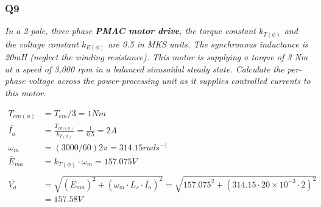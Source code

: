 \documentclass[a4paper,11pt]{article}
\begin{document}
\subsubsection*{Q9}
\textit{In a 2-pole, three-phase \textbf{PMAC motor drive}, the torque constant $k_{T(\phi)}$ and the voltage constant $k_{E(\phi)}$ are 0.5 in MKS units. The synchronous inductance is 20mH (neglect the winding resistance). This motor is supplying a torque of 3 Nm at a speed of 3,000 rpm in a balanced sinusoidal steady state. Calculate the per-phase voltage across the power-processing unit as it supplies controlled currents to this motor.}

\begin{align*}
    T_{em(\phi)} &= T_{em}/3 = 1Nm\\
    \bar{I_a} &= \frac{T_{em(\phi)}}{k_{T(\phi)}} = \frac{1}{0.5} = 2A\\
    \omega_m &= (3000/60)2\pi = 314.15 rads^{-1}\\
    \bar{E}_{ma} &= k_{T(\phi)} \cdot \omega_m = 157.075 V\\\\
    \bar{V_a} &= \sqrt{(\bar{E}_{ma})^2 + (\omega_m \cdot L_s \cdot \bar{I_a} )^2} = \sqrt{157.075^2 + (314.15 \cdot 20 \times 10^{-3} \cdot 2 )^2}\\
    &= 157.58V
\end{align*}
\end{document}
